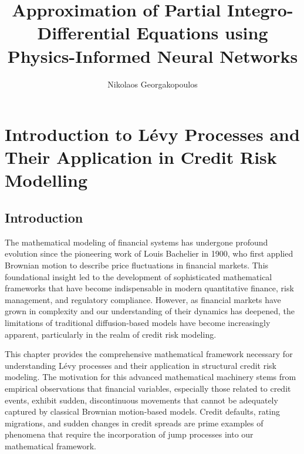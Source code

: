 \documentclass[11pt,twoside,openright]{report}
\title{Approximation of Partial Integro-Differential Equations using Physics-Informed Neural Networks}
\author{Nikolaos Georgakopoulos}
\date{\the\year{}}
\begin{document}
\doublespacing



\maketitle








\chapter{Introduction to Lévy Processes and Their Application in Credit Risk Modelling}
\label{chap:intro_levy_credit}

\section{Introduction}
\label{sec:intro_chapter1}

The mathematical modeling of financial systems has undergone profound evolution since the pioneering work of Louis Bachelier in 1900, who first applied Brownian motion to describe price fluctuations in financial markets. This foundational insight led to the development of sophisticated mathematical frameworks that have become indispensable in modern quantitative finance, risk management, and regulatory compliance. However, as financial markets have grown in complexity and our understanding of their dynamics has deepened, the limitations of traditional diffusion-based models have become increasingly apparent, particularly in the realm of credit risk modeling.

This chapter provides the comprehensive mathematical framework necessary for understanding Lévy processes and their application in structural credit risk modeling. The motivation for this advanced mathematical machinery stems from empirical observations that financial variables, especially those related to credit events, exhibit sudden, discontinuous movements that cannot be adequately captured by classical Brownian motion-based models. Credit defaults, rating migrations, and sudden changes in credit spreads are prime examples of phenomena that require the incorporation of jump processes into our mathematical framework.
\end{document}
